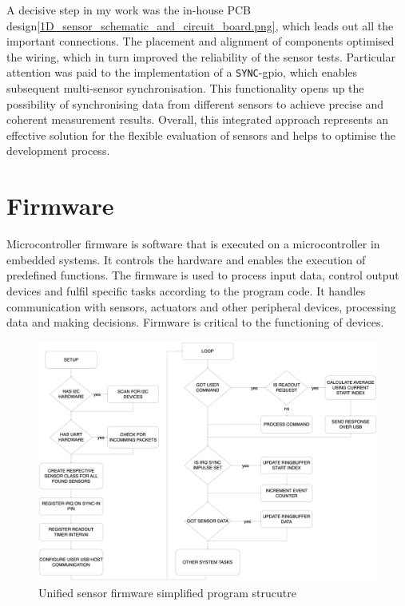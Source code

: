A decisive step in my work was the in-house PCB
design\ref{1D_sensor_schematic_and_circuit_board.png}, which leads out
all the important connections. The placement and alignment of components
optimised the wiring, which in turn improved the reliability of the
sensor tests. Particular attention was paid to the implementation of a
\passthrough{\lstinline!SYNC!}-\gls{gpio}, which enables subsequent
multi-sensor synchronisation. This functionality opens up the
possibility of synchronising data from different sensors to achieve
precise and coherent measurement results. Overall, this integrated
approach represents an effective solution for the flexible evaluation of
sensors and helps to optimise the development process.

\hypertarget{firmware}{%
\section{Firmware}\label{firmware}}

Microcontroller firmware is software that is executed on a
microcontroller in embedded systems. It controls the hardware and
enables the execution of predefined functions. The firmware is used to
process input data, control output devices and fulfil specific tasks
according to the program code. It handles communication with sensors,
actuators and other peripheral devices, processing data and making
decisions. Firmware is critical to the functioning of devices.

\begin{figure}
\centering
\includegraphics{./generated_images/border_Unified_sensor_firmware_simplified_program_strucutre.png}
\caption{Unified sensor firmware simplified program strucutre
\label{Unified_sensor_firmware_simplified_program_strucutre.png}}
\end{figure}

